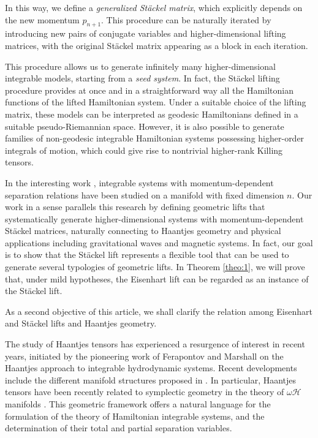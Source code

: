 \documentclass[10pt]{amsart}
\numberwithin{equation}{section}
\theoremstyle{definition}
\begin{document}
	In this way, we define a \textit{generalized St\"ackel matrix}, which explicitly depends on the new momentum $p_{n+1}$. This procedure can be naturally iterated by introducing new pairs of conjugate variables and higher-dimensional lifting matrices, with the original Stäckel matrix appearing as a block in each iteration.
	
	This procedure allows us to generate infinitely many higher-dimensional integrable models, starting from a \textit{seed system}. In fact, the St\"ackel lifting procedure provides at once and in a straightforward way all the Hamiltonian functions of the lifted Hamiltonian system. Under a suitable choice of the lifting matrix, these models can be interpreted as geodesic Hamiltonians defined in a suitable pseudo-Riemannian space. However, it is also possible to generate families of non-geodesic integrable Hamiltonian systems possessing higher-order integrals of motion, which could give rise to nontrivial higher-rank Killing tensors.
	
	In the interesting work \cite{BSPLA2011}, integrable systems with momentum-dependent separation relations have been studied on a manifold with fixed dimension $n$. Our work in a sense parallels this research by defining geometric lifts that systematically generate higher-dimensional systems with momentum-dependent Stäckel matrices, naturally connecting  to Haantjes geometry and physical applications including gravitational waves and magnetic systems.	In fact, our goal is to show that the St\"ackel lift represents a flexible tool that can be used to generate several typologies of geometric lifts. In Theorem \ref{theo:1}, we will prove that, under mild hypotheses, the Eisenhart lift can be regarded as an instance of the St\"ackel lift.
	
	As a second objective of this article, we shall clarify the relation among Eisenhart and St\"ackel lifts and Haantjes geometry. 
	
	The study of Haantjes tensors has experienced a resurgence of interest in recent years, initiated by the pioneering work of Ferapontov and Marshall \cite{FM2007MA} on the Haantjes approach to integrable hydrodynamic systems. Recent developments include the different manifold structures proposed in \cite{AT2025prepr,BKM2025,CMP2025prepr,MGall13,MGall15,
		MMcSV2024}. In particular, Haantjes tensors have been recently related to symplectic geometry in the theory of $\omega \mathscr{H}$ manifolds \cite{TT2021JGP,TT2022AMPA,RTT2022CNS,KRTT2024PRA,RTT2024AMPA}. This geometric framework offers a natural language for the formulation of the theory of Hamiltonian integrable systems, and the determination of their total and partial separation variables. 
	
\end{document}
